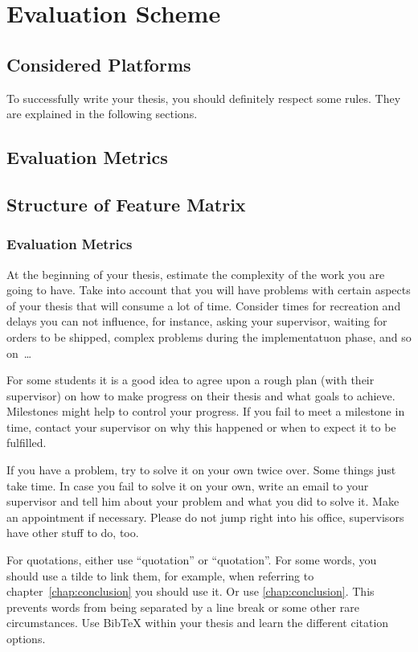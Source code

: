 \chapter{Evaluation Scheme} \label{chap:evaluation-scheme}

\section{Considered Platforms}

To successfully write your thesis, you should definitely respect some rules. They are explained in the following sections.

\section{Evaluation Metrics}

\section{Structure of Feature Matrix}

\subsection{Evaluation Metrics}
At the beginning of your thesis, estimate the complexity of the work you are going to have. Take into account that you will have problems with certain aspects of your thesis that will consume a lot of time. Consider times for recreation and delays you can not influence, for instance, asking your supervisor, waiting for orders to be shipped, complex problems during the implementatuon phase, and so on~\dots

For some students it is a good idea to agree upon a rough plan (with their supervisor) on how to make progress on their thesis and what goals to achieve. Milestones might help to control your progress. If you fail to meet a milestone in time, contact your supervisor on why this happened or when to expect it to be fulfilled.

If you have a problem, try to solve it on your own twice over. Some things just take time. In case you fail to solve it on your own, write an email to your supervisor and tell him about your problem and what you did to solve it. Make an appointment if necessary. Please do not jump right into his office, supervisors have other stuff to do, too.

For quotations, either use ``quotation'' or \enquote{quotation}. For some words, you should use a tilde to link them, for example, when referring to chapter~\ref{chap:conclusion} you should use it. Or use \autoref{chap:conclusion}. This prevents words from being separated by a line break or some other rare circumstances. Use BibTeX within your thesis and learn the different citation options. 

